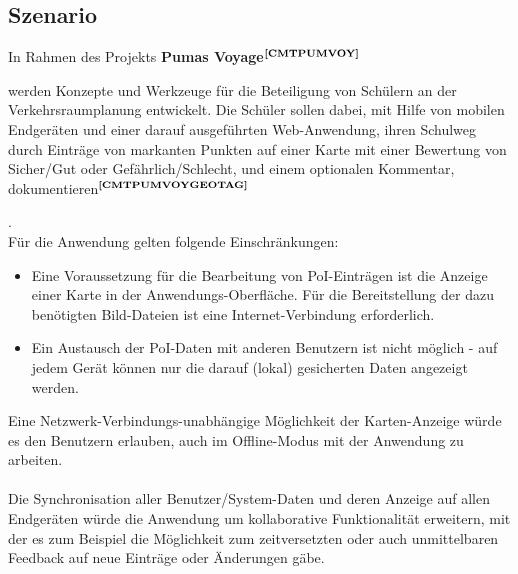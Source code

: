 \subsection{Szenario}\label{2_SZEN}
In Rahmen des Projekts \textbf{Pumas Voyage}$^{\textbf{\ref{CMTPUMVOY}}}$%
\addtocounter{footnote}{1}%
 werden Konzepte und Werkzeuge für die Beteiligung von Schülern an der Verkehrsraumplanung entwickelt. Die Schüler sollen dabei, mit Hilfe von mobilen Endgeräten und einer darauf ausgeführten Web-Anwendung, ihren Schulweg durch Einträge von markanten Punkten  auf einer Karte mit einer Bewertung von Sicher/Gut oder Gefährlich/Schlecht, und einem optionalen Kommentar, dokumentieren$^{\textbf{\ref{CMTPUMVOYGEOTAG}}}$
\addtocounter{footnote}{1}%
.\\
Für die Anwendung gelten folgende Einschränkungen:
\begin{itemize}[leftmargin=*,noitemsep,topsep=1ex,parsep=0pt,partopsep=0pt]
\item Eine Voraussetzung für die Bearbeitung von PoI-Einträgen ist die Anzeige einer Karte in der Anwendungs-Oberfläche. Für die Bereitstellung der dazu benötigten Bild-Dateien ist eine Internet-Verbindung erforderlich.
\item Ein Austausch der PoI-Daten mit anderen Benutzern ist nicht möglich - auf jedem Gerät können nur die darauf (lokal) gesicherten Daten angezeigt werden.
\end{itemize}
\vspace{1ex}
Eine Netzwerk-Verbindungs-unabhängige Möglichkeit der Karten-Anzeige würde es den Benutzern erlauben, auch im Offline-Modus mit der Anwendung zu arbeiten.\\ \\
Die Synchronisation aller Benutzer/System-Daten und deren Anzeige auf allen Endgeräten würde die Anwendung um kollaborative Funktionalität erweitern, mit der es zum Beispiel die Möglichkeit zum zeitversetzten oder auch unmittelbaren Feedback auf neue Einträge oder Änderungen gäbe.
